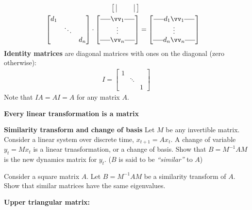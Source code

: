 \documentclass[a4paper,11pt]{exam}
\newcounter{ct}
\newcommand{\horzbar}{\rule[.5ex]{1.5em}{0.4pt}}
\newcommand{\inv}{^{-1}}
\begin{document}
\begin{tcolorbox}[colback=black!1!,title=Matrix Fun Facts]
\begin{align}
\begin{bmatrix}
	\kern.3em\vline\kern.3em
	&
	&
	\kern.3em\vline\kern.3em
    \end{bmatrix}
    \\
    \begin{bmatrix}
	d_1 & & \\
	    & \ddots & \\
	    & & d_n
    \end{bmatrix}
    \cdot
    \begin{bmatrix}
	\horzbar \vv_1 \horzbar \\
	\vdots \\
	\horzbar \vv_n \horzbar
    \end{bmatrix}
    &=
    \begin{bmatrix}
	\horzbar d_1 \vv_1 \horzbar \\
	\vdots \\
	\horzbar d_n \vv_n \horzbar
    \end{bmatrix}
\end{align}
\textbf{Identity matrices} are diagonal matrices with ones on the diagonal (zero otherwise):
\begin{align}
    I =
    \begin{bmatrix}
	1 & & \\
	    & \ddots & \\
	    & & 1
    \end{bmatrix}
\end{align}
Note that $IA = AI = A$ for any matrix $A$.
\end{tcolorbox}

\begin{questions}
\question \textbf{Every linear transformation is a matrix}

\question \textbf{Similarity transform and change of basis}
Let $M$ be any invertible matrix.
Consider a linear system over discrete time, $x_{t+1} = Ax_t$.
A change of variable $y_t = Mx_t$ is a linear trnasformation, or a change of basis.
Show that $B = M\inv A M$ is the new dynamics matrix for $y_t$.
($B$ is said to be \textit{``similar''} to $A$)

\question Consider a square matrix $A$. Let $B = M\inv A M$ be a similarity transform of $A$.
Show that similar matrices have the same eigenvalues.

\question \textbf{Upper triangular matrix:}



\end{questions}
\end{document}
